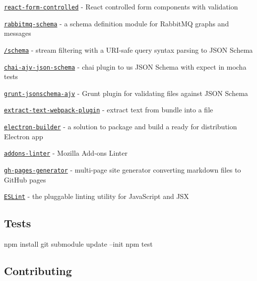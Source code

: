 \begin{DoxyItemize}
\item \href{https://github.com/seeden/react-form-controlled}{\tt react-\/form-\/controlled} -\/ React controlled form components with validation
\item \href{https://github.com/tjmehta/rabbitmq-schema}{\tt rabbitmq-\/schema} -\/ a schema definition module for Rabbit\+MQ graphs and messages
\item \href{https://www.npmjs.com/package/@query/schema}{\tt /schema} -\/ stream filtering with a U\+R\+I-\/safe query syntax parsing to J\+S\+ON Schema
\item \href{https://github.com/peon374/chai-ajv-json-schema}{\tt chai-\/ajv-\/json-\/schema} -\/ chai plugin to us J\+S\+ON Schema with expect in mocha tests
\item \href{https://github.com/SignpostMarv/grunt-jsonschema-ajv}{\tt grunt-\/jsonschema-\/ajv} -\/ Grunt plugin for validating files against J\+S\+ON Schema
\item \href{https://github.com/webpack-contrib/extract-text-webpack-plugin}{\tt extract-\/text-\/webpack-\/plugin} -\/ extract text from bundle into a file
\item \href{https://github.com/electron-userland/electron-builder}{\tt electron-\/builder} -\/ a solution to package and build a ready for distribution Electron app
\item \href{https://github.com/mozilla/addons-linter}{\tt addons-\/linter} -\/ Mozilla Add-\/ons Linter
\item \href{https://github.com/epoberezkin/gh-pages-generator}{\tt gh-\/pages-\/generator} -\/ multi-\/page site generator converting markdown files to Git\+Hub pages
\item \href{https://github.com/eslint/eslint}{\tt E\+S\+Lint} -\/ the pluggable linting utility for Java\+Script and J\+SX
\end{DoxyItemize}

\subsection*{Tests}


\begin{DoxyCode}
npm install
git submodule update --init
npm test
\end{DoxyCode}


\subsection*{Contributing}


